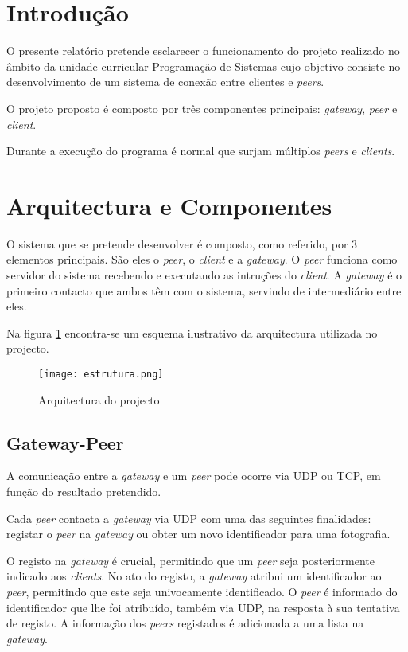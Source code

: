 \documentclass[a4paper, 12pt]{article}
\newcommand{\gateway}{\textit{gateway}\xspace}
\newcommand{\peer}{\textit{peer}\xspace}
\newcommand{\client}{\textit{client}\xspace}
\newcommand{\cliente}{\textit{client}\xspace}
\newcommand{\peers}{\textit{peers}\xspace}
\newcommand{\clients}{\textit{clients}\xspace}
\newcommand{\clientes}{\textit{clients}\xspace}
\begin{document}


\section{Introdução}

O presente relatório pretende esclarecer o funcionamento do projeto realizado no âmbito da unidade curricular Programação de Sistemas cujo objetivo consiste no desenvolvimento de um sistema de conexão entre clientes e \peers.

O projeto proposto é composto por três componentes principais: \gateway, \peer e \cliente.

Durante a execução do programa é normal que surjam múltiplos \peers e \clientes.


\section{Arquitectura e Componentes}


O sistema que se pretende desenvolver é composto, como referido, por 3 elementos principais. São eles o \peer, o \client e a \gateway. O \peer funciona como servidor do sistema recebendo e executando as intruções do \client. 
A \gateway é o primeiro contacto que ambos têm com o sistema, servindo de intermediário entre eles. 

Na figura \ref{fig:estrutura} encontra-se um esquema ilustrativo da arquitectura utilizada no projecto.


\begin{figure}[H]
\texttt{[image: estrutura.png]}
  \caption{Arquitectura do projecto}
  \label{fig:estrutura}
\centering
\end{figure}


\subsection{Gateway-Peer}

A comunicação entre a \gateway e um \peer pode ocorre via UDP ou TCP, em função do resultado pretendido.

Cada \peer contacta a \gateway via UDP com uma das seguintes finalidades: registar o \peer na \gateway ou obter um novo identificador para uma fotografia. 

O registo na \gateway é crucial, permitindo que um \peer seja posteriormente indicado aos \clients. No ato do registo, a \gateway atribui um identificador ao \peer, permitindo que este seja univocamente identificado. O \peer é informado do identificador que lhe foi atribuído, também via UDP, na resposta à sua tentativa de registo. A informação dos \peers registados é adicionada a uma lista na \gateway.
\end{document}
